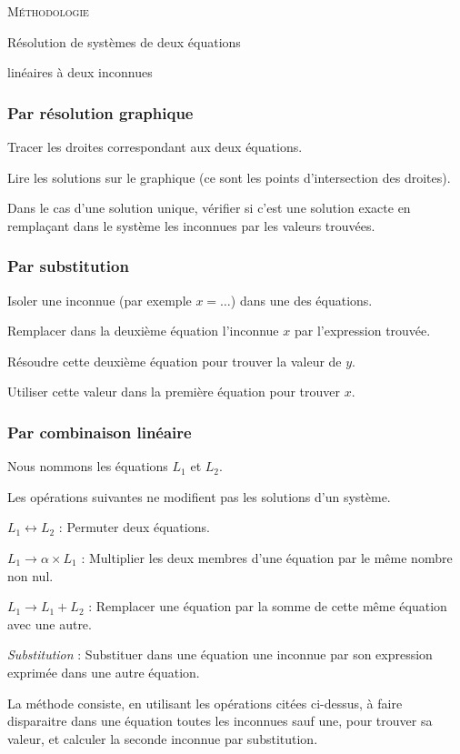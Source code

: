 \documentclass[12pt]{article}
\begin{document}
\begin{center}
  \textsc{Méthodologie}

{\Large
  Résolution de systèmes 
  de deux équations
  
  linéaires
à deux inconnues
}
\end{center}

\setcounter{subsubsection}{-1}
\subsubsection{Par résolution graphique}
\begin{compactenum}
\item Tracer les droites correspondant aux deux équations.
\item Lire les solutions sur le graphique (ce sont les points d'intersection des droites).
\item Dans le cas d'une solution unique, vérifier si c'est une solution exacte
  en remplaçant dans le système les inconnues par les valeurs trouvées.
\end{compactenum}

\subsubsection{Par substitution}
\begin{compactenum}
\item Isoler une inconnue (par exemple $x=\ldots$) dans une des équations.
\item Remplacer dans la deuxième équation l'inconnue $x$ par l'expression trouvée.
\item Résoudre cette deuxième équation pour trouver la valeur de $y$.
\item Utiliser cette valeur dans la première équation pour trouver $x$.
\end{compactenum}

\subsubsection{Par combinaison linéaire}
Nous nommons les équations $L_1$ et $L_2$.

Les opérations suivantes ne modifient pas les solutions d'un système.
  \begin{compactitem}
  \item $L_1 \leftrightarrow L_2$ : Permuter deux équations.
  \item $L_1 \rightarrow \alpha \times L_1$ : Multiplier les deux membres d'une équation par le même nombre non nul.
  \item $L_1 \rightarrow L_1 + L_2$ : Remplacer une équation par la somme de cette même équation avec une autre.
  \item \textit{Substitution} : Substituer dans une équation une inconnue par son expression exprimée dans une autre équation.
  \end{compactitem}
  La méthode consiste, en utilisant les opérations citées ci-dessus, à \og{}faire disparaitre\fg{} dans une équation toutes les inconnues sauf une, pour trouver sa valeur, et calculer la seconde inconnue par substitution.
\end{document}
